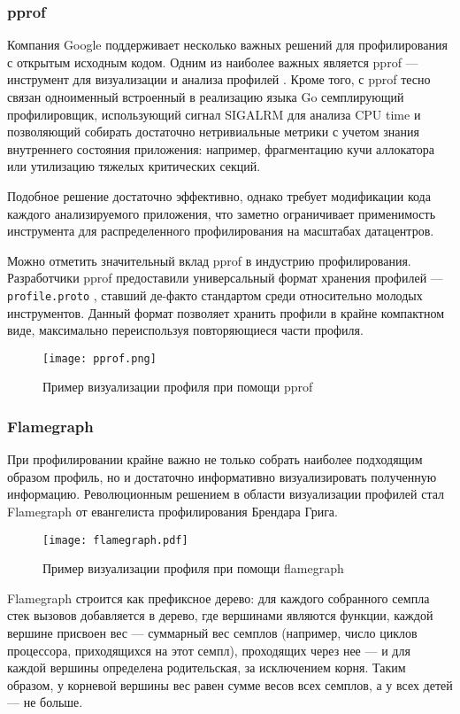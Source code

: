 \subsubsection{pprof}
Компания Google поддерживает несколько важных решений для профилирования с открытым исходным кодом.
Одним из наиболее важных является pprof --- инструмент для визуализации и анализа профилей \cite{pprof}.
Кроме того, с pprof тесно связан одноименный встроенный в реализацию языка Go семплирующий профилировщик,
использующий сигнал SIGALRM для анализа CPU time \cite{pprof:golang} и позволяющий собирать достаточно нетривиальные метрики
с учетом знания внутреннего состояния приложения: например, фрагментацию кучи аллокатора или утилизацию тяжелых критических секций.

Подобное решение достаточно эффективно, однако требует модификации кода каждого анализируемого приложения,
что заметно ограничивает применимость инструмента для распределенного профилирования на масштабах датацентров.

Можно отметить значительный вклад pprof в индустрию профилирования.
Разработчики pprof предоставили универсальный формат хранения профилей
--- \verb!profile.proto! \cite{pprof:proto}, ставший де-факто стандартом
среди относительно молодых инструментов.
Данный формат позволяет хранить профили в крайне компактном виде, максимально переиспользуя повторяющиеся части профиля.

\begin{figure}[H]
    \centering
    \texttt{[image: pprof.png]}
    \caption{Пример визуализации профиля при помощи pprof}
    \label{fig:pprof}
\end{figure}

\subsubsection{Flamegraph}
При профилировании крайне важно не только собрать наиболее подходящим образом профиль, но и достаточно информативно визуализировать
полученную информацию. Революционным решением в области визуализации профилей стал Flamegraph \cite{flamegraph}
от евангелиста профилирования Брендара Грига.

\begin{figure}[H]
    \centering
    \texttt{[image: flamegraph.pdf]}
    \caption{Пример визуализации профиля при помощи flamegraph}
    \label{fig:flamegraph}
\end{figure}

Flamegraph строится как префиксное дерево: для каждого собранного семпла стек вызовов добавляется в дерево, где вершинами являются
функции, каждой вершине присвоен вес --- суммарный вес семплов (например, число циклов процессора, приходящихся на этот семпл),
проходящих через нее --- и для каждой вершины определена родительская, за исключением корня.
Таким образом, у корневой вершины вес равен сумме весов всех семплов, а у всех детей --- не больше.

